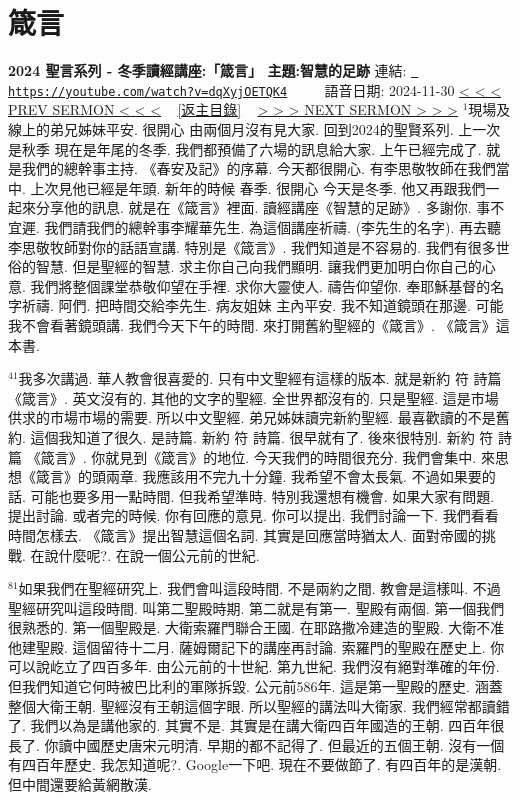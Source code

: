 \documentclass{book}
\begin{document}
\section{箴言}
\label{sec:dqXyjOETQK4}
\textbf{2024 聖言系列 - 冬季讀經講座:「箴言」 主題:智慧的足跡}
\newline
\newline
連結: \href{https://youtube.com/watch?v=dqXyjOETQK4}{\texttt{ https://youtube.com/watch?v=dqXyjOETQK4}} ~~~~ 語音日期: 2024-11-30 
\newline
\newline
\hyperref[sec:m4SkjH3Fp_4]{\small{< < < PREV SERMON < < <}}
~
\hyperref[sec:index]{\small{[返主目錄]}}
~
\hyperref[sec:EZL_OCl_lJE]{\small{> > > NEXT SERMON > > >}}
\newline
\newline
$^{1}$現場及線上的弟兄姊妹平安.
很開心 由兩個月沒有見大家.
回到2024的聖賢系列.
上一次是秋季 現在是年尾的冬季.
我們都預備了六場的訊息給大家.
上午已經完成了.
就是我們的總幹事主持.
《春安及記》的序幕.
今天都很開心.
有李思敬牧師在我們當中.
上次見他已經是年頭.
新年的時候 春季.
很開心 今天是冬季.
他又再跟我們一起來分享他的訊息.
就是在《箴言》裡面.
讀經講座《智慧的足跡》.
多謝你.
事不宜遲.
我們請我們的總幹事李耀華先生.
為這個講座祈禱.
(李先生的名字).
再去聽李思敬牧師對你的話語宣講.
特別是《箴言》.
我們知道是不容易的.
我們有很多世俗的智慧.
但是聖經的智慧.
求主你自己向我們顯明.
讓我們更加明白你自己的心意.
我們將整個課堂恭敬仰望在手裡.
求你大靈使人.
禱告仰望你.
奉耶穌基督的名字祈禱.
阿們.
把時間交給李先生.
病友姐妹 主內平安.
我不知道鏡頭在那邊.
可能我不會看著鏡頭講.
我們今天下午的時間.
來打開舊約聖經的《箴言》.
《箴言》這本書.

$^{41}$我多次講過.
華人教會很喜愛的.
只有中文聖經有這樣的版本.
就是新約 符 詩篇 《箴言》.
英文沒有的.
其他的文字的聖經.
全世界都沒有的.
只是聖經.
這是市場供求的市場市場的需要.
所以中文聖經.
弟兄姊妹讀完新約聖經.
最喜歡讀的不是舊約.
這個我知道了很久.
是詩篇.
新約 符 詩篇.
很早就有了.
後來很特別.
新約 符 詩篇 《箴言》.
你就見到《箴言》的地位.
今天我們的時間很充分.
我們會集中.
來思想《箴言》的頭兩章.
我應該用不完九十分鐘.
我希望不會太長氣.
不過如果要的話.
可能也要多用一點時間.
但我希望準時.
特別我還想有機會.
如果大家有問題.
提出討論.
或者完的時候.
你有回應的意見.
你可以提出.
我們討論一下.
我們看看時間怎樣去.
《箴言》提出智慧這個名詞.
其實是回應當時猶太人.
面對帝國的挑戰.
在說什麼呢?.
在說一個公元前的世紀.

$^{81}$如果我們在聖經研究上.
我們會叫這段時間.
不是兩約之間.
教會是這樣叫.
不過聖經研究叫這段時間.
叫第二聖殿時期.
第二就是有第一.
聖殿有兩個.
第一個我們很熟悉的.
第一個聖殿是.
大衛索羅門聯合王國.
在耶路撒冷建造的聖殿.
大衛不准他建聖殿.
這個留待十二月.
薩姆爾記下的講座再討論.
索羅門的聖殿在歷史上.
你可以說屹立了四百多年.
由公元前的十世紀.
第九世紀.
我們沒有絕對準確的年份.
但我們知道它何時被巴比利的軍隊拆毀.
公元前586年.
這是第一聖殿的歷史.
涵蓋整個大衛王朝.
聖經沒有王朝這個字眼.
所以聖經的講法叫大衛家.
我們經常都讀錯了.
我們以為是講他家的.
其實不是.
其實是在講大衛四百年國造的王朝.
四百年很長了.
你讀中國歷史唐宋元明清.
早期的都不記得了.
但最近的五個王朝.
沒有一個有四百年歷史.
我怎知道呢?.
Google一下吧.
現在不要做節了.
有四百年的是漢朝.
但中間還要給黃網散漢.
\end{document}
